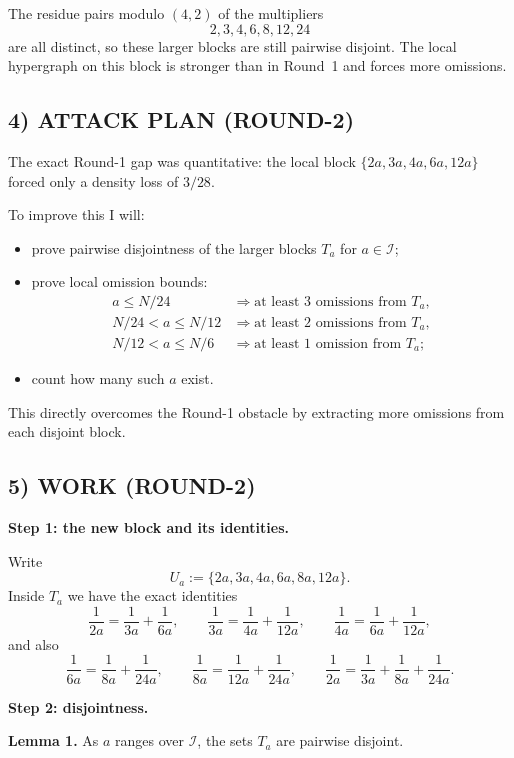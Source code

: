 The residue pairs modulo $(4,2)$ of the multipliers
\[
2,3,4,6,8,12,24
\]
are all distinct, so these larger blocks are still pairwise disjoint. The local hypergraph on this block is stronger than in Round~1 and forces more omissions.

\subsection*{4) ATTACK PLAN (ROUND-2)}

The exact Round-1 gap was quantitative: the local block $\{2a,3a,4a,6a,12a\}$ forced only a density loss of $3/28$.

To improve this I will:
\begin{itemize}
\item prove pairwise disjointness of the larger blocks $T_a$ for $a\in\mathcal I$;
\item prove local omission bounds:
\[
\begin{array}{ll}
a\le N/24 & \Longrightarrow \mbox{at least $3$ omissions from }T_a,\\
N/24<a\le N/12 & \Longrightarrow \mbox{at least $2$ omissions from }T_a,\\
N/12<a\le N/6 & \Longrightarrow \mbox{at least $1$ omission from }T_a;
\end{array}
\]
\item count how many such $a$ exist.
\end{itemize}

This directly overcomes the Round-1 obstacle by extracting more omissions from each disjoint block.

\subsection*{5) WORK (ROUND-2)}

\medskip
\noindent\textbf{Step 1: the new block and its identities.}

Write
\[
U_a:=\{2a,3a,4a,6a,8a,12a\}.
\]
Inside $T_a$ we have the exact identities
\[
\frac1{2a}=\frac1{3a}+\frac1{6a},
\qquad
\frac1{3a}=\frac1{4a}+\frac1{12a},
\qquad
\frac1{4a}=\frac1{6a}+\frac1{12a},
\]
and also
\[
\frac1{6a}=\frac1{8a}+\frac1{24a},
\qquad
\frac1{8a}=\frac1{12a}+\frac1{24a},
\qquad
\frac1{2a}=\frac1{3a}+\frac1{8a}+\frac1{24a}.
\]

\medskip
\noindent\textbf{Step 2: disjointness.}

\medskip
\noindent\textbf{Lemma 1.}
As $a$ ranges over $\mathcal I$, the sets $T_a$ are pairwise disjoint.

